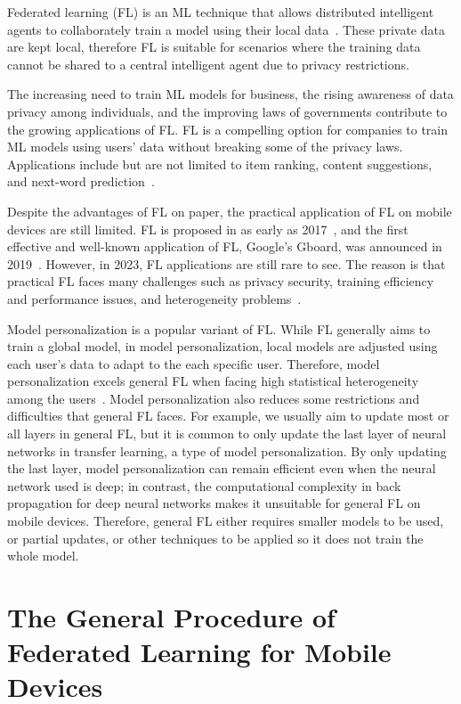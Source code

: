 \documentclass[conference]{IEEEtran}
\begin{document}
Federated learning (FL) is an ML technique that
allows distributed intelligent agents to collaborately train a model using
their local data~\cite{mcmahan2017communication}.
These private data are kept local,
therefore FL is suitable for scenarios where
the training data cannot be shared to a central intelligent agent due to
privacy restrictions.

The increasing need to train ML models for business,
the rising awareness of data privacy among individuals,
and the improving laws of governments contribute to
the growing applications of FL.
FL is a compelling option for companies to train ML models using users' data
without breaking some of the privacy laws.
Applications include but are not limited to item ranking, content suggestions,
and next-word prediction~\cite{bonawitz2019towards}.

Despite the advantages of FL on paper,
the practical application of FL on mobile devices are still limited.
FL is proposed in as early as 2017~\cite{mcmahan2017communication},
and the first effective and well-known application of FL, Google's Gboard,
was announced in 2019~\cite{bonawitz2019towards}.
However, in 2023, FL applications are still rare to see.
The reason is that practical FL faces many challenges such as
privacy security, training efficiency and performance issues,
and heterogeneity problems~\cite{wen2023survey}.

Model personalization is a popular variant of FL.
While FL generally aims to train a global model,
in model personalization,
local models are adjusted using each user's data to
adapt to the each specific user.
Therefore, model personalization excels general FL when
facing high statistical heterogeneity among the users~\cite{kulkarni2020survey}.
Model personalization also reduces some restrictions and difficulties that
general FL faces.
For example,
we usually aim to update most or all layers in general FL,
but it is common to only update the last layer of neural networks in
transfer learning,
a type of model personalization.
By only updating the last layer,
model personalization can remain efficient even when
the neural network used is deep;
in contrast, the computational complexity in back propagation for
deep neural networks makes it unsuitable for general FL on mobile devices.
Therefore, general FL either requires smaller models to be used,
or partial updates,
or other techniques to be applied so it does not train the whole model.

\section{The General Procedure of Federated Learning for Mobile Devices}
\end{document}
